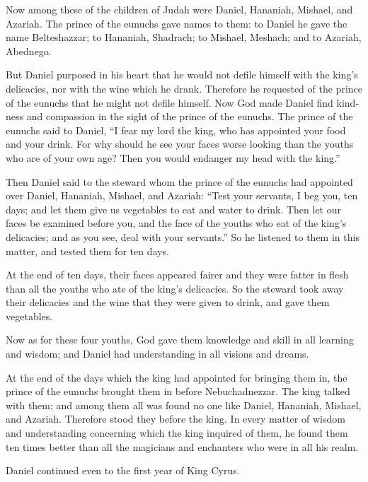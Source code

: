 \begin{paracol}{2}
\begin{otherlanguage}{english}
 Now among these of the children of Judah were Daniel,
Hananiah, Mishael, and Azariah.  The prince of the eunuchs
gave names to them: to Daniel he gave the name Belteshazzar; to
Hananiah, Shadrach; to Mishael, Meshach; and to Azariah, Abednego.

 But Daniel purposed in his heart that he would not defile
himself with the king's delicacies, nor with the wine which he drank.
Therefore he requested of the prince of the eunuchs that he might not
defile himself.  Now God made Daniel find kindness and
compassion in the sight of the prince of the eunuchs. 
The prince of the eunuchs said to Daniel, ``I fear my lord the king, who
has appointed your food and your drink. For why should he see your faces
worse looking than the youths who are of your own age? Then you would
endanger my head with the king.''

 Then Daniel said to the steward whom the prince of the
eunuchs had appointed over Daniel, Hananiah, Mishael, and Azariah:
 ``Test your servants, I beg you, ten days; and let them
give us vegetables to eat and water to drink.  Then let
our faces be examined before you, and the face of the youths who eat of
the king's delicacies; and as you see, deal with your servants.''
 So he listened to them in this matter, and tested them
for ten days.

 At the end of ten days, their faces appeared fairer and
they were fatter in flesh than all the youths who ate of the king's
delicacies.  So the steward took away their delicacies
and the wine that they were given to drink, and gave them vegetables.

 Now as for these four youths, God gave them knowledge
and skill in all learning and wisdom; and Daniel had understanding in
all visions and dreams.

 At the end of the days which the king had appointed for
bringing them in, the prince of the eunuchs brought them in before
Nebuchadnezzar.  The king talked with them; and among
them all was found no one like Daniel, Hananiah, Mishael, and Azariah.
Therefore stood they before the king.  In every matter of
wisdom and understanding concerning which the king inquired of them, he
found them ten times better than all the magicians and enchanters who
were in all his realm.

 Daniel continued even to the first year of King Cyrus.


\end{otherlanguage}
\end{paracol}

